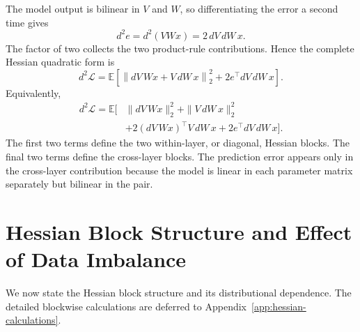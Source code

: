 \documentclass[11pt]{article}
\newcommand{\E}{\mathbb{E}}
\begin{document}
The model output is bilinear in \(V\) and \(W\), so differentiating the error
a second time gives
\begin{equation*}
d^2e=d^2(VWx)=2\,dV\,dW\,x.
\end{equation*}
The factor of two collects the two product-rule contributions.  Hence the
complete Hessian quadratic form is
\begin{equation}
d^2\mathcal{L}
=\E\!\left[
\left\|dV\,Wx+V\,dW\,x\right\|_2^2
+2e^\top dV\,dW\,x
\right].
\label{eq:full-hessian}
\end{equation}
Equivalently,
\begin{equation*}
\begin{aligned}
d^2\mathcal{L}
=\E\Big[
&\|dV\,Wx\|_2^2
+\|V\,dW\,x\|_2^2\\
&+2(dV\,Wx)^\top V\,dW\,x
+2e^\top dV\,dW\,x
\Big].
\end{aligned}
\end{equation*}
The first two terms define the two within-layer, or diagonal, Hessian blocks.
The final two terms define the cross-layer blocks.  The prediction error
appears only in the cross-layer contribution because the model is linear in
each parameter matrix separately but bilinear in the pair.

\section{Hessian Block Structure and Effect of Data Imbalance}
\label{sec:hessian-blocks}

We now state the Hessian block structure and its distributional dependence.
The detailed blockwise calculations are deferred to
Appendix~\ref{app:hessian-calculations}.
\end{document}
